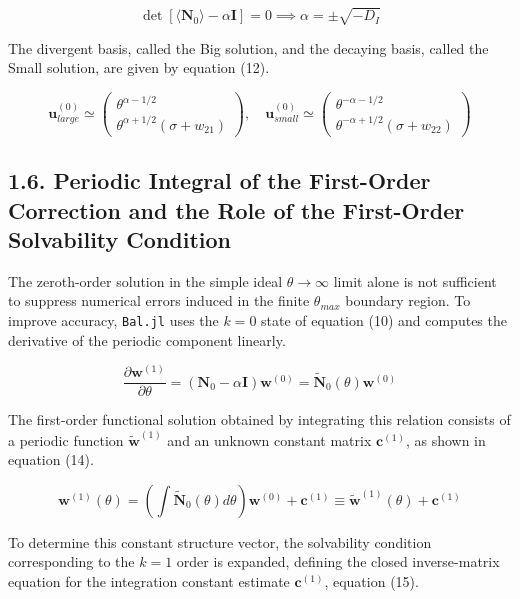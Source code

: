 \documentclass[11pt,a4paper]{article}
\begin{document}
\[ \det[\langle \mathbf{N}_0 \rangle - \alpha \mathbf{I}] = 0 \implies \alpha = \pm \sqrt{-D_I} \tag{11} \]

The divergent basis, called the Big solution, and the decaying basis, called the
Small solution, are given by equation (12).

\[ \mathbf{u}_{large}^{(0)} \simeq \begin{pmatrix} \theta^{\alpha - 1/2} \\ \theta^{\alpha + 1/2} ( \sigma + w_{21} ) \end{pmatrix}, \quad \mathbf{u}_{small}^{(0)} \simeq \begin{pmatrix} \theta^{-\alpha - 1/2} \\ \theta^{-\alpha + 1/2} ( \sigma + w_{22} ) \end{pmatrix} \tag{12} \]

\subsection{1.6. Periodic Integral of the First-Order Correction and the Role of the First-Order Solvability Condition}\label{periodic-integral-of-first-order-correction-and-role-of-first-order-solvability-condition}

The zeroth-order solution in the simple ideal \(\theta \to \infty\) limit alone is
not sufficient to suppress numerical errors induced in the finite \(\theta_{max}\)
boundary region. To improve accuracy, \texttt{Bal.jl} uses the \(k=0\) state of
equation (10) and computes the derivative of the periodic component linearly.

\[ \frac{\partial \mathbf{w}^{(1)}}{\partial\theta} = (\mathbf{N}_0 - \alpha\mathbf{I})\mathbf{w}^{(0)} = \tilde{\mathbf{N}}_0(\theta)\mathbf{w}^{(0)} \tag{13} \]

The first-order functional solution obtained by integrating this relation consists
of a periodic function \(\tilde{\mathbf{w}}^{(1)}\) and an unknown constant matrix
\(\mathbf{c}^{(1)}\), as shown in equation (14).

\[ \mathbf{w}^{(1)}(\theta) = \left( \int \tilde{\mathbf{N}}_0(\theta) d\theta \right) \mathbf{w}^{(0)} + \mathbf{c}^{(1)} \equiv \tilde{\mathbf{w}}^{(1)}(\theta) + \mathbf{c}^{(1)} \tag{14} \]

To determine this constant structure vector, the solvability condition
corresponding to the \(k=1\) order is expanded, defining the closed inverse-matrix
equation for the integration constant estimate \(\mathbf{c}^{(1)}\), equation (15).
\end{document}
